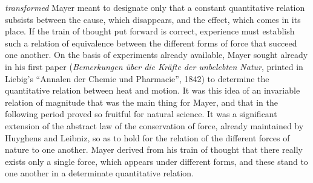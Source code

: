 \documentclass[12pt,a4paper]{book}
\newcommand{\opage}[1]{\marginnote{\footnotesize\textit{[#1]}}}
\begin{document}
\emph{\opage{498}transformed} Mayer meant to designate only that a constant quantitative
relation subsists between the cause, which disappears, and the effect, which
comes in its place. If the train of thought put forward is correct, experience
must establish such a relation of equivalence between the different forms of
force that succeed one another. On the basis of experiments already available,
Mayer sought already in his first paper (\textit{Bemerkungen über die Kräfte der
unbelebten Natur}, printed in Liebig's ``Annalen der Chemie und Pharmacie'',
1842) to determine the quantitative relation between heat and motion. It was
this idea of an invariable relation of magnitude that was the main thing for
Mayer, and that in the following period proved so fruitful for natural science.
It was a significant extension of the abstract law of the conservation of force,
already maintained by Huyghens and Leibniz, so as to hold for the relation of
the different forces of nature to one another. Mayer derived from his train of
thought that there really exists only a single force, which appears under
different forms, and these stand to one another in a determinate quantitative
relation.
\end{document}
